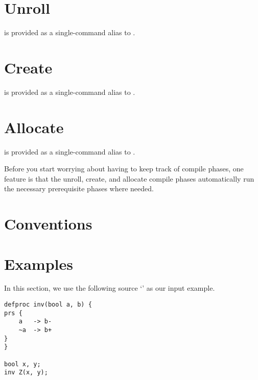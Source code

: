 \section{Unroll}
\label{sec:compiler:unroll}

 is provided as a single-command alias to .  

\section{Create}
\label{sec:compiler:create}

 is provided as a single-command alias to .  

\section{Allocate}
\label{sec:compiler:alloc}

 is provided as a single-command alias to .  

Before you start worrying about having to keep track of compile phases, 
one feature is that the unroll, create, and allocate compile phases 
automatically run the necessary prerequisite phases where needed.  

\section{Conventions}
\label{sec:compiler:comventions}



\section{Examples}
\label{sec:compiler:examples}

In this section, we use the following source `' 
as our input example.  

\begin{verbatim}
defproc inv(bool a, b) {
prs {
	a	-> b-
	~a	-> b+
}
}

bool x, y;
inv Z(x, y);
\end{verbatim}


